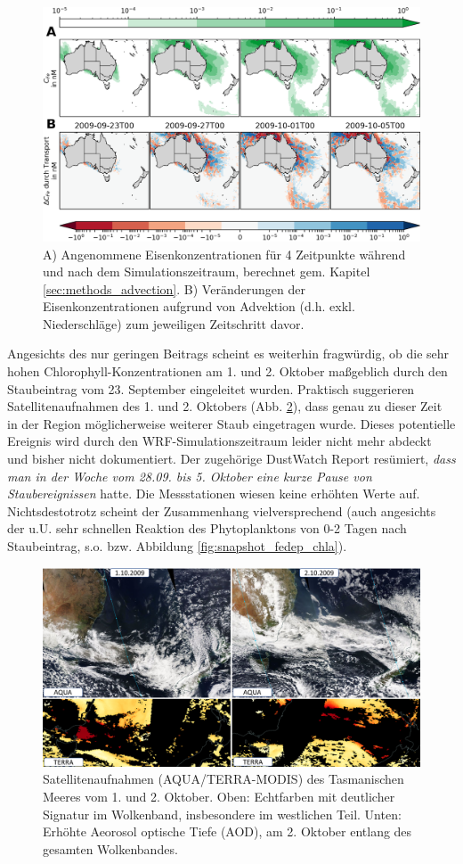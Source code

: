 \documentclass[12pt,a4paper,onecolumn]{scrartcl}
\begin{document}
\begin{figure}[!htb]
\includegraphics[width=\textwidth]{bilder/iron_transport.png}
\caption{A) Angenommene Eisenkonzentrationen für 4 Zeitpunkte während und nach dem Simulationszeitraum, berechnet gem. Kapitel \ref{sec:methods_advection}. B) Veränderungen der Eisenkonzentrationen aufgrund von Advektion (d.h. exkl. Niederschläge) zum jeweiligen Zeitschritt davor.} \label{fig:iron_transport}
\end{figure}
Angesichts des nur geringen Beitrags scheint es weiterhin fragwürdig, ob die sehr hohen Chlorophyll-Konzentrationen am 1. und 2. Oktober maßgeblich durch den Staubeintrag vom 23. September eingeleitet wurden. Praktisch suggerieren Satellitenaufnahmen des 1. und 2. Oktobers (Abb. \ref{fig:satellite_october}), dass genau zu dieser Zeit in der Region möglicherweise weiterer Staub eingetragen wurde. Dieses potentielle Ereignis wird durch den WRF-Simulationszeitraum leider nicht mehr abdeckt und bisher nicht dokumentiert. Der zugehörige DustWatch Report \citep{Leys.2009b} resümiert, \textit{dass man in der Woche vom 28.09. bis 5. Oktober eine kurze Pause von Staubereignissen} hatte. Die Messstationen wiesen keine erhöhten Werte auf. Nichtsdestotrotz scheint der Zusammenhang vielversprechend (auch angesichts der u.U. sehr schnellen Reaktion des Phytoplanktons von 0-2 Tagen nach Staubeintrag, s.o. bzw. Abbildung \ref{fig:snapshot_fedep_chla}).
\begin{figure}[!htb]
\includegraphics[width=\textwidth]{bilder/satellite_october.png}
\caption{Satellitenaufnahmen (AQUA/TERRA-MODIS) des Tasmanischen Meeres vom 1. und 2. Oktober. Oben: Echtfarben mit deutlicher Signatur im Wolkenband, insbesondere im westlichen Teil. Unten: Erhöhte Aeorosol optische Tiefe (AOD), am 2. Oktober entlang des gesamten Wolkenbandes.} \label{fig:satellite_october}
\end{figure}
\end{document}
